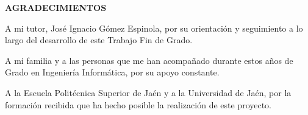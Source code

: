 \begin{center}
{\Large \bfseries AGRADECIMIENTOS}
\vspace{2.5cm}
\end{center}

A mi tutor, José Ignacio Gómez Espinola, por su orientación y seguimiento a lo largo del desarrollo de este Trabajo Fin de Grado.

A mi familia y a las personas que me han acompañado durante estos años de Grado en Ingeniería Informática, por su apoyo constante.

A la Escuela Politécnica Superior de Jaén y a la Universidad de Jaén, por la formación recibida que ha hecho posible la realización de este proyecto.
